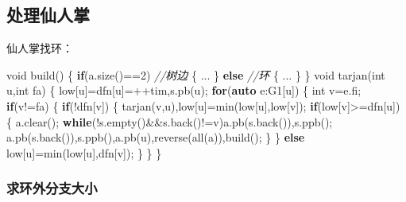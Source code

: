 \documentclass[
]{article}
\newenvironment{Shaded}{}{}
\newcommand{\CommentTok}[1]{\textcolor[rgb]{0.38,0.63,0.69}{\textit{#1}}}
\newcommand{\ControlFlowTok}[1]{\textcolor[rgb]{0.00,0.44,0.13}{\textbf{#1}}}
\newcommand{\DataTypeTok}[1]{\textcolor[rgb]{0.56,0.13,0.00}{#1}}
\newcommand{\DecValTok}[1]{\textcolor[rgb]{0.25,0.63,0.44}{#1}}
\newcommand{\KeywordTok}[1]{\textcolor[rgb]{0.00,0.44,0.13}{\textbf{#1}}}
\newcommand{\NormalTok}[1]{#1}
\begin{document}
\hypertarget{ux5904ux7406ux4ed9ux4ebaux638c}{%
\subsection{处理仙人掌}\label{ux5904ux7406ux4ed9ux4ebaux638c}}

仙人掌找环：

\begin{Shaded}
\begin{Highlighting}[]
\DataTypeTok{void}\NormalTok{ build()}
\NormalTok{\{}
    \ControlFlowTok{if}\NormalTok{(a.size()==}\DecValTok{2}\NormalTok{) }\CommentTok{//树边}
\NormalTok{    \{}
\NormalTok{        ...}
\NormalTok{    \}}
    \ControlFlowTok{else} \CommentTok{//环}
\NormalTok{    \{}
\NormalTok{        ...}
\NormalTok{    \}}
\NormalTok{\}}
\DataTypeTok{void}\NormalTok{ tarjan(}\DataTypeTok{int}\NormalTok{ u,}\DataTypeTok{int}\NormalTok{ fa)}
\NormalTok{\{}
\NormalTok{    low[u]=dfn[u]=++tim,s.pb(u);}
    \ControlFlowTok{for}\NormalTok{(}\KeywordTok{auto}\NormalTok{ e:G1[u])}
\NormalTok{    \{}
        \DataTypeTok{int}\NormalTok{ v=e.fi;}
        \ControlFlowTok{if}\NormalTok{(v!=fa)}
\NormalTok{        \{}
            \ControlFlowTok{if}\NormalTok{(!dfn[v])}
\NormalTok{            \{}
\NormalTok{                tarjan(v,u),low[u]=min(low[u],low[v]);}
                \ControlFlowTok{if}\NormalTok{(low[v]\textgreater{}=dfn[u])}
\NormalTok{                \{}
\NormalTok{                    a.clear(); }\ControlFlowTok{while}\NormalTok{(!s.empty()\&\&s.back()!=v)a.pb(s.back()),s.ppb();}
\NormalTok{                    a.pb(s.back()),s.ppb(),a.pb(u),reverse(all(a)),build();}
\NormalTok{                \}}
\NormalTok{            \}}
            \ControlFlowTok{else}\NormalTok{ low[u]=min(low[u],dfn[v]);}
\NormalTok{        \}}
\NormalTok{    \}}
\NormalTok{\}}
\end{Highlighting}
\end{Shaded}

\hypertarget{ux6c42ux73afux5916ux5206ux652fux5927ux5c0f}{%
\subsubsection{求环外分支大小}\label{ux6c42ux73afux5916ux5206ux652fux5927ux5c0f}}
\end{document}
